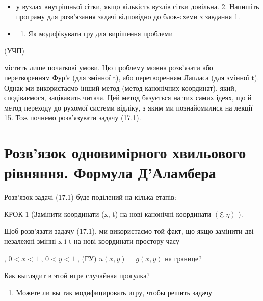 \documentclass[
  ukrainian,
]{article}
\providecommand{\tightlist}{%
  \setlength{\itemsep}{0pt}\setlength{\parskip}{0pt}}
\begin{document}
\begin{itemize}
\tightlist
\item
  у вузлах внутрішньої сітки, якщо кількість вузлів сітки довільна. 2.
  Напишіть програму для розв'язання задачі відповідно до блок-схеми з
  завдання 1.
\item
  \begin{enumerate}
  \def\labelenumi{\arabic{enumi}.}
  \setcounter{enumi}{2}
  \tightlist
  \item
    Як модифікувати гру для вирішення проблеми
  \end{enumerate}
\end{itemize}

(УЧП)

містить лише початкові умови. Цю проблему можна розв'язати або
перетворенням Фур'є (для змінної t), або перетворенням Лапласа (для
змінної t). Однак ми використаємо інший метод (метод канонічних
координат), який, сподіваємося, зацікавить читача. Цей метод базується
на тих самих ідеях, що й метод переходу до рухомої системи відліку, з
яким ми познайомилися на лекції 15. Тож почнемо розв'язувати задачу
(17.1).

\section{Розв'язок одновимірного хвильового рівняння. Формула
Д'Аламбера}\label{ux440ux43eux437ux432ux44fux437ux43eux43a-ux43eux434ux43dux43eux432ux438ux43cux456ux440ux43dux43eux433ux43e-ux445ux432ux438ux43bux44cux43eux432ux43eux433ux43e-ux440ux456ux432ux43dux44fux43dux43dux44f.-ux444ux43eux440ux43cux443ux43bux430-ux434ux430ux43bux430ux43cux431ux435ux440ux430}

Розв'язок задачі (17.1) буде поділений на кілька етапів:

КРОК 1 (Замінити координати (x, t) на нові канонічні координати
\((\xi, \eta)\) ).

Щоб розв'язати задачу (17.1), ми використаємо той факт, що якщо замінити
дві незалежні змінні x і t на нові координати простору-часу

, \(0 < x < 1\) , \(0 < y < 1\) , (ГУ) \(u(x, y) = g(x, y)\) на границе?

Как выглядит в этой игре случайная прогулка?

\begin{enumerate}
\def\labelenumi{\arabic{enumi}.}
\setcounter{enumi}{3}
\tightlist
\item
  Можете ли вы так модифицировать игру, чтобы решить задачу
\end{enumerate}
\end{document}
